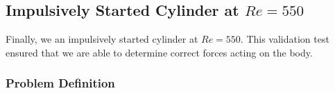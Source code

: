 %     
%     

\subsection{Impulsively Started Cylinder at $Re=550$}
\label{subsec:eul_isc}
Finally, we an impulsively started cylinder at $Re=550$. This validation test ensured that we are able to determine correct forces acting on the body. 

\subsubsection*{Problem Definition}

